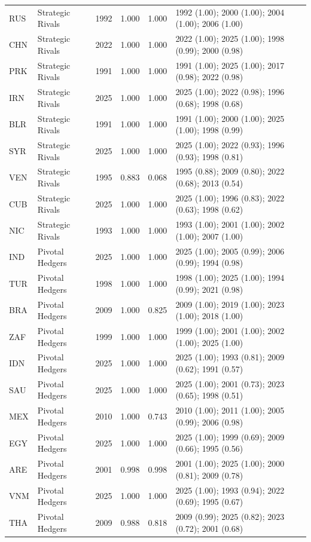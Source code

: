 \begin{table}
\begin{tabularx}{\textwidth}{@{}l l r r r X@{}}
RUS & Strategic Rivals & 1992 & 1.000 & 1.000 & 1992 (1.00); 2000 (1.00); 2004 (1.00); 2006 (1.00) \\
CHN & Strategic Rivals & 2022 & 1.000 & 1.000 & 2022 (1.00); 2025 (1.00); 1998 (0.99); 2000 (0.98) \\
PRK & Strategic Rivals & 1991 & 1.000 & 1.000 & 1991 (1.00); 2025 (1.00); 2017 (0.98); 2022 (0.98) \\
IRN & Strategic Rivals & 2025 & 1.000 & 1.000 & 2025 (1.00); 2022 (0.98); 1996 (0.68); 1998 (0.68) \\
BLR & Strategic Rivals & 1991 & 1.000 & 1.000 & 1991 (1.00); 2000 (1.00); 2025 (1.00); 1998 (0.99) \\
SYR & Strategic Rivals & 2025 & 1.000 & 1.000 & 2025 (1.00); 2022 (0.93); 1996 (0.93); 1998 (0.81) \\
VEN & Strategic Rivals & 1995 & 0.883 & 0.068 & 1995 (0.88); 2009 (0.80); 2022 (0.68); 2013 (0.54) \\
CUB & Strategic Rivals & 2025 & 1.000 & 1.000 & 2025 (1.00); 1996 (0.83); 2022 (0.63); 1998 (0.62) \\
NIC & Strategic Rivals & 1993 & 1.000 & 1.000 & 1993 (1.00); 2001 (1.00); 2002 (1.00); 2007 (1.00) \\
IND & Pivotal Hedgers & 2025 & 1.000 & 1.000 & 2025 (1.00); 2005 (0.99); 2006 (0.99); 1994 (0.98) \\
TUR & Pivotal Hedgers & 1998 & 1.000 & 1.000 & 1998 (1.00); 2025 (1.00); 1994 (0.99); 2021 (0.98) \\
BRA & Pivotal Hedgers & 2009 & 1.000 & 0.825 & 2009 (1.00); 2019 (1.00); 2023 (1.00); 2018 (1.00) \\
ZAF & Pivotal Hedgers & 1999 & 1.000 & 1.000 & 1999 (1.00); 2001 (1.00); 2002 (1.00); 2025 (1.00) \\
IDN & Pivotal Hedgers & 2025 & 1.000 & 1.000 & 2025 (1.00); 1993 (0.81); 2009 (0.62); 1991 (0.57) \\
SAU & Pivotal Hedgers & 2025 & 1.000 & 1.000 & 2025 (1.00); 2001 (0.73); 2023 (0.65); 1998 (0.51) \\
MEX & Pivotal Hedgers & 2010 & 1.000 & 0.743 & 2010 (1.00); 2011 (1.00); 2005 (0.99); 2006 (0.98) \\
EGY & Pivotal Hedgers & 2025 & 1.000 & 1.000 & 2025 (1.00); 1999 (0.69); 2009 (0.66); 1995 (0.56) \\
ARE & Pivotal Hedgers & 2001 & 0.998 & 0.998 & 2001 (1.00); 2025 (1.00); 2000 (0.81); 2009 (0.78) \\
VNM & Pivotal Hedgers & 2025 & 1.000 & 1.000 & 2025 (1.00); 1993 (0.94); 2022 (0.69); 1995 (0.67) \\
THA & Pivotal Hedgers & 2009 & 0.988 & 0.818 & 2009 (0.99); 2025 (0.82); 2023 (0.72); 2001 (0.68) \\
\bottomrule
\end{tabularx}
\end{table}
